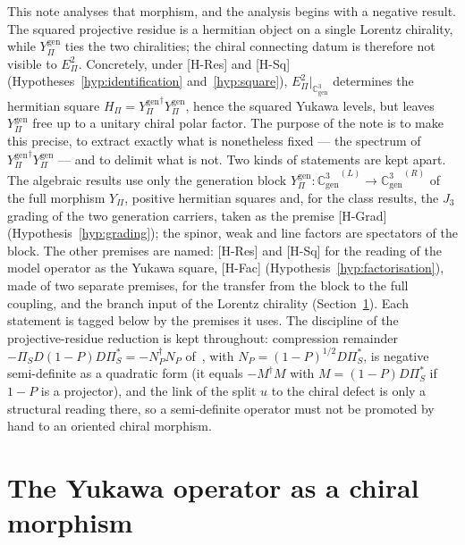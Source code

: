 \documentclass[11pt]{article}
\theoremstyle{definition}
\theoremstyle{remark}
\newcommand{\Jthree}{J_{3}}
\newcommand{\Cgen}{\mathbb{C}^{3}_{\mathrm{gen}}}
\newcommand{\Epi}{E_{\Pi}}
\newcommand{\GL}{{\Cgen}^{(L)}}
\newcommand{\GR}{{\Cgen}^{(R)}}
\newcommand{\Ypi}{Y_{\Pi}}
\newcommand{\Ygen}{{Y^{\mathrm{gen}}_{\Pi}}}
\newcommand{\Hpi}{H_{\Pi}}
\begin{document}
    This note analyses that morphism, and the analysis begins with a negative result.
    The squared projective residue is a hermitian object on a single Lorentz chirality, while $\Ygen$ ties the two
    chiralities; the chiral connecting datum is therefore not visible to $\Epi^{2}$.
    Concretely, under [H-Res] and [H-Sq] (Hypotheses~\ref{hyp:identification} and~\ref{hyp:square}),
    $\Epi^{2}|_{\Cgen}$ determines the hermitian square $\Hpi = \Ygen^{\dagger}\Ygen$, hence the squared Yukawa levels,
    but leaves $\Ygen$ free up to a unitary chiral polar factor.
    The purpose of the note is to make this precise, to extract exactly what is nonetheless fixed --- the
    spectrum of $\Ygen^{\dagger}\Ygen$ --- and to delimit what is not.
    Two kinds of statements are kept apart.
    The algebraic results use only the generation block $\Ygen : \GL \to \GR$ of the full morphism $\Ypi$, positive
    hermitian squares and, for the class results, the $\Jthree$ grading of the two generation carriers, taken as the
    premise [H-Grad] (Hypothesis~\ref{hyp:grading}); the spinor, weak and line factors are spectators of the block.
    The other premises are named: [H-Res] and [H-Sq] for the reading of the model operator as the
    Yukawa square, [H-Fac] (Hypothesis~\ref{hyp:factorisation}), made of two separate premises, for the transfer from
    the block to the full coupling, and the branch input of the Lorentz chirality (Section~\ref{sec:morphism}).
    Each statement is tagged below by the premises it uses.
    The discipline of the projective-residue reduction is kept throughout: compression remainder
    $-\Pi_{S} D (1 - P) D \Pi_{S}^{*} = -N_{P}^{\dagger} N_{P}$ of~\cite{Beau2026prs}, with
    $N_{P} = (1 - P)^{1/2} D \Pi_{S}^{*}$, is negative semi-definite as a quadratic form (it equals $-M^{\dagger}M$ with
    $M = (1 - P) D \Pi_{S}^{*}$ if $1 - P$ is a projector), and the link of the split $u$ to the chiral defect is only a structural reading there, so a semi-definite
    operator must not be promoted by hand to an oriented chiral morphism.

  \section{The Yukawa operator as a chiral morphism}
    \label{sec:morphism}
\end{document}

